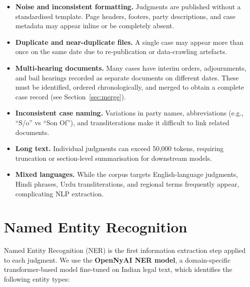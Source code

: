 \begin{itemize}
    \item \textbf{Noise and inconsistent formatting.} Judgments are published without a standardised template. Page headers, footers, party descriptions, and case metadata may appear inline or be completely absent.
    \item \textbf{Duplicate and near-duplicate files.} A single case may appear more than once on the same date due to re-publication or data-crawling artefacts.
    \item \textbf{Multi-hearing documents.} Many cases have interim orders, adjournments, and bail hearings recorded as separate documents on different dates. These must be identified, ordered chronologically, and merged to obtain a complete case record (see Section~\ref{sec:merge}).
    \item \textbf{Inconsistent case naming.} Variations in party names, abbreviations (e.g., ``S/o'' vs ``Son Of''), and transliterations make it difficult to link related documents.
    \item \textbf{Long text.} Individual judgments can exceed 50,000 tokens, requiring truncation or section-level summarisation for downstream models.
    \item \textbf{Mixed languages.} While the corpus targets English-language judgments, Hindi phrases, Urdu transliterations, and regional terms frequently appear, complicating NLP extraction.
\end{itemize}

\section{Named Entity Recognition}
\label{sec:ner}

Named Entity Recognition (NER) is the first information extraction step applied to each judgment. We use the \textbf{OpenNyAI NER model}, a domain-specific transformer-based model fine-tuned on Indian legal text, which identifies the following entity types:

